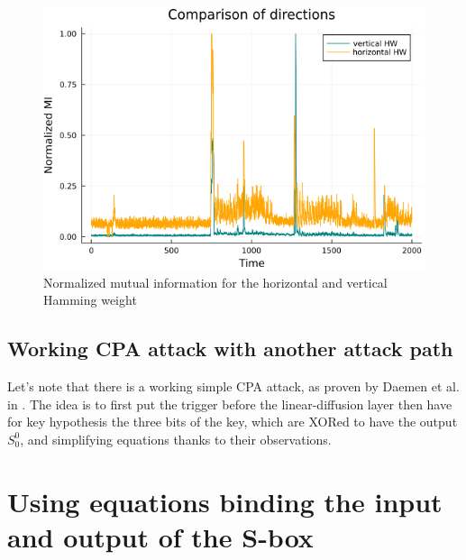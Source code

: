 \documentclass[11pt,technote]{IEEEtran}
\begin{document}
	\begin{figure}[h]
		\centering
		\includegraphics[scale=0.4]{img_files/h_and_v_one_byte}
		\caption{Normalized mutual information for the horizontal and vertical Hamming weight}
		\label{hvval}
	\end{figure}
	
	\subsection{Working CPA attack with another attack path}
	Let's note that there is a working simple CPA attack, as proven by Daemen et al. in \cite{cpa_lin}. The idea is to first put the trigger before the linear-diffusion layer then have for key hypothesis the three bits of the key, which are XORed to have the output $S_0^0$, and simplifying equations thanks to their observations.
	
	\section{Using equations binding the input and output of the S-box}
\end{document}

